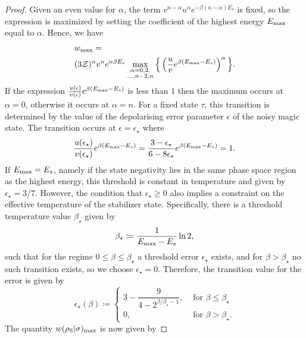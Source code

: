 \documentclass[
twocolumn,
superscriptaddress
]{revtex4-1}
\def\Z{{\cal Z}}
\begin{document}
\begin{proof}
Given an even value for $\alpha$, the term $v^{n-\alpha} u^{\alpha} e^{-\beta (n-\alpha)E_s}$ is fixed, so the expression is maximized by setting the coefficient of the highest energy $E_{\rm{max}}$ equal to $\alpha$.
Hence, we have
\begin{align}
	&w_{\rm max} = \nonumber\\
	&(3\Z)^{n} v^n e^{n\beta E_s}\max\limits_{\substack{\alpha = 0,2, \\ \dots,n-2,n}}{\Big\{ \left( \frac{u}{v} e^{\beta (E_{\rm{max}} - E_s)} \right)^{\alpha} \Big\}}.
\end{align}
If the expression $\frac{u(\epsilon)}{v(\epsilon)} e^{\beta (E_{\rm{max}} - E_s)}$ is less than $1$ then the maximum occurs at $\alpha=0$, otherwise it occurs at $\alpha = n$. For a fixed state $\tau$, this transition is determined by the value of the depolarising error parameter $\epsilon$ of the noisy magic state. The transition occurs at $\epsilon = \epsilon_\star$ where
\begin{equation}\label{eq:noise_transition}
	\frac{u(\epsilon_\star)}{v(\epsilon_\star)} e^{\beta (E_{\rm{max}} - E_s)} = \frac{3-\epsilon_\star}{6-8\epsilon_\star} e^{\beta (E_{\rm{max}} - E_s)} = 1.
\end{equation}
If $E_{\rm{max}} = E_s$, namely if the state negativity lies in the same phase space region as the highest energy, this threshold is constant in temperature and given by $\epsilon_{\star} = 3/7$. However, the condition that $\epsilon_\star \ge 0$ also implies a constraint on the effective temperature of the stabilizer state. Specifically, there is a threshold temperature value $\beta_\star$ given by
\begin{equation}
	\beta_{\star} \coloneqq \frac{1}{E_{\rm{max}} - E_s} \ln2,
\end{equation}
such that for the regime $0 \leq \beta \leq \beta_\star$ a threshold error $\epsilon_\star$ exists, and for $\beta > \beta_\star$ no such transition exists, so we choose $\epsilon_\star = 0$. 
Therefore, the transition value for the error is given by
\begin{equation}
	\epsilon_{\star}(\beta) \coloneqq 
	\begin{cases}
		3 - \dfrac{9}{4-2^{\beta/\beta_\star - 1}}, &\text{ for } \beta \leq \beta_\star \\
		0, &\text{ for } \beta > \beta_\star.
	\end{cases}
\end{equation}
The quantity $w(\rho_{\rm{S}} | \sigma)_{\rm{max}}$ is now given by

\end{proof}
\end{document}
